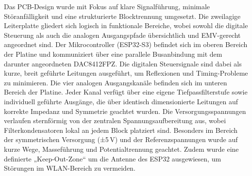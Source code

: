 Das PCB-Design wurde mit Fokus auf klare Signalführung, minimale Störanfälligkeit und eine strukturierte Blocktrennung umgesetzt. Die zweilagige Leiterplatte gliedert sich logisch in funktionale Bereiche, wobei sowohl die digitale Steuerung als auch die analogen Ausgangspfade übersichtlich und EMV-gerecht angeordnet sind.
Der Mikrocontroller (ESP32-S3) befindet sich im oberen Bereich der Platine und kommuniziert über eine parallele Busanbindung mit dem darunter angeordneten DAC8412FPZ. Die digitalen Steuersignale sind dabei als kurze, breit geführte Leitungen ausgeführt, um Reflexionen und Timing-Probleme zu minimieren.
Die vier analogen Ausgangskanäle befinden sich im unteren Bereich der Platine. Jeder Kanal verfügt über eine eigene Tiefpassfilterstufe sowie individuell geführte Ausgänge, die über identisch dimensionierte Leitungen auf korrekte Impedanz und Symmetrie geachtet wurden.
Die Versorgungsspannungen verlaufen sternförmig von der zentralen Spannungsaufbereitung aus, wobei Filterkondensatoren lokal an jedem Block platziert sind. Besonders im Bereich der symmetrischen Versorgung (±5\,V) und der Referenzspannungen wurde auf kurze Wege, Masseführung und Potentialtrennung geachtet.
Zudem wurde eine definierte „Keep-Out-Zone“ um die Antenne des ESP32 ausgewiesen, um Störungen im WLAN-Bereich zu vermeiden.